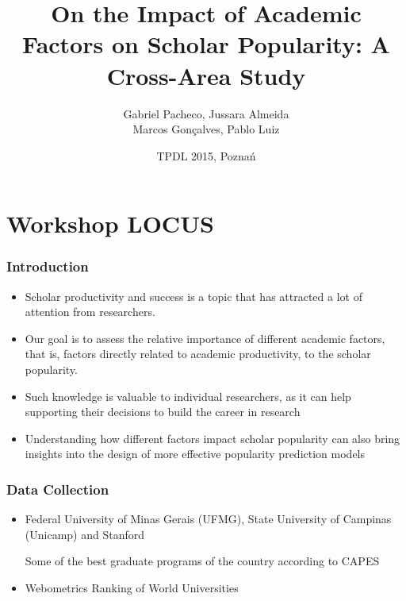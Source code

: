\documentclass{beamer}
\title[]{\LARGE{On the Impact of Academic Factors on Scholar Popularity: A Cross-Area Study}}
\author[]{Gabriel Pacheco, Jussara Almeida \\ Marcos Gonçalves, Pablo Luiz \\}
\institute{Computer Science Department \\ Federal University of Minas Gerais \\}
\date{TPDL 2015, Poznań}
\begin{document}
\frame{\titlepage}



\section{Workshop LOCUS}
\frame
{
	\frametitle{Introduction}
	\begin{itemize}
 		\item Scholar productivity and success is a topic that has attracted a lot of attention from researchers.
		\vspace{0.3cm}
		
 		\item Our goal is to assess the relative importance of different academic factors, that is, factors directly related to academic productivity, to the scholar popularity.
 		\vspace{0.3cm}
 		
		\item Such knowledge is valuable to individual researchers, as it can help supporting their decisions 
 	to build the career in research
 		\vspace{0.3cm}
 		
 		\item Understanding how different factors impact scholar popularity can also bring insights into the 
 	design of more effective popularity prediction models 		
 			
	\end{itemize}
}


\frame
{
	 \frametitle{Data Collection}
	 \begin{itemize}
	 	\item Federal University of Minas Gerais (UFMG), State University of Campinas (Unicamp) and Stanford
	 			
	 	\alert {Some of the best graduate programs of the country according to CAPES}
	 	\vspace{0.3cm}
	 	
	 	
	 \end{itemize}
	 \begin{itemize}
	 	\item Webometrics Ranking of World Universities
	 \end{itemize}	
}
\end{document}
